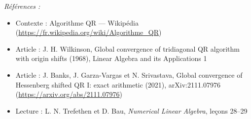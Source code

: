 \documentclass[11pt]{article}
\newenvironment{refs}{\par\small\noindent\emph{Références :}\begin{itemize}\setlength\itemsep{0pt}}{\end{itemize}\normalsize}
\begin{document}
\begin{refs}
\item Contexte : Algorithme QR --- Wikipédia (\url{https://fr.wikipedia.org/wiki/Algorithme_QR})
\item Article : J. H. Wilkinson, \og{} Global convergence of tridiagonal QR algorithm with origin shifts \fg{} (1968), Linear Algebra and its Applications 1
\item Article : J. Banks, J. Garza-Vargas et N. Srivastava, \og{} Global convergence of Hessenberg shifted QR I: exact arithmetic \fg{} (2021), arXiv:2111.07976 (\url{https://arxiv.org/abs/2111.07976})
\item Lecture : L. N. Trefethen et D. Bau, \textit{Numerical Linear Algebra}, leçons 28--29
\end{refs}

\bigskip
\end{document}
